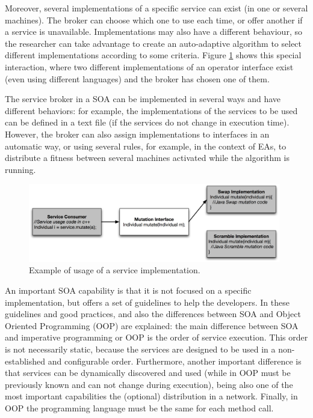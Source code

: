 Moreover, several implementations of a specific service  can exist (in one or several machines). The broker can choose which one to use  each time, or offer another if a service is unavailable. Implementations  may also have a different behaviour, so the researcher can take advantage to create an auto-adaptive algorithm to select different implementations according to some criteria. Figure \ref{fig:servicebasic} shows this special interaction, where two different implementations of an operator interface exist (even using different languages) and the broker has chosen one of them.


The service broker in a SOA can be implemented in several ways and have
different behaviors: for example, the implementations of the services to be used can be
defined in a text file (if the services do not change in execution
time). However, the broker can also assign implementations to
interfaces in an automatic way, or using several rules, for example, in the context of EAs,
to distribute a fitness between several machines activated while the
algorithm is running. 


\begin{figure}
\centering
\includegraphics[width=26pc]{gfx/soa/exampleSOA.jpg}
\caption{Example of usage of a service implementation.}
\label{fig:servicebasic}
\end{figure}




An important SOA capability is that it is not focused on a specific
implementation, but offers a set of guidelines to help the
developers. In \citep{Arsanjani2008SOMA} these guidelines and good practices, and also the differences between SOA and Object Oriented
Programming (OOP) are
explained: the main difference between SOA and imperative programming or OOP is the order of service execution. This order is not necessarily static, because the services are designed to be used in a non-established and configurable order. Furthermore, another important difference is that services can be dynamically discovered and used (while in OOP must be previously known and can not change during execution), being also one of the most important capabilities the (optional) distribution in a network. Finally, in OOP the programming language must be the same for each method call.

